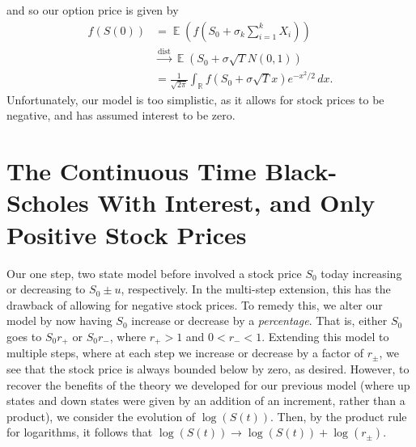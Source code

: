 \documentclass[12pt]{article}
\newcommand{\rr}{\mathbb{R}}
\DeclareMathOperator{\ex}{\mathbb{E}}
\theoremstyle{plain}
\theoremstyle{definition}
\theoremstyle{remark}
\numberwithin{equation}{section}  %
\begin{document}
	and so our option price is given by
	\begin{equation*}
		\begin{split}
			f(S(0)) & = \ex(f(S_{0} + \sigma_{k} \sum_{i=1}^{k} X_{i}))
			\\
			& \xrightarrow{\text{dist}} \ex(S_{0} + \sigma \sqrt{T}N(0,1))
			\\
			& = \frac{1}{\sqrt{2 \pi}} \int_{\rr} f(S_{0} + \sigma \sqrt{T}x)
			e^{-x^{2}/2}
			\, dx. 
		\end{split}
	\end{equation*}
	Unfortunately, our model is too simplistic, as it allows for stock prices to
	be negative, and has assumed interest to be zero. 
	\section{The Continuous Time Black-Scholes With Interest, and Only
	Positive Stock Prices}
Our one step, two state model before involved a stock price $S_{0}$ today
increasing or decreasing to $S_{0} \pm u$, respectively. In the multi-step
extension, this has the drawback of allowing for negative stock prices. 
To remedy this, we alter our model by now having $S_{0}$ increase or decrease by a \emph{percentage}.
That is, either $S_{0}$  goes to $S_{0}r_{+}$  or $S_{0}r_{-}$, where
$r_{+} > 1$  and $0 < r_{-} < 1$. Extending this model to multiple
steps, where at each step we increase or decrease by a factor of $r_{\pm}$,
we see that the stock price is always bounded below by zero, as desired.
However, to recover the benefits of the theory we developed for our previous
model (where up states and down states were given by an addition of an
increment, rather than a product), we
consider the evolution of  $\log(S(t))$. Then, by the product rule for logarithms,
it follows that $\log(S(t)) \to \log(S(t)) + \log(r_{\pm})$.
\end{document}
